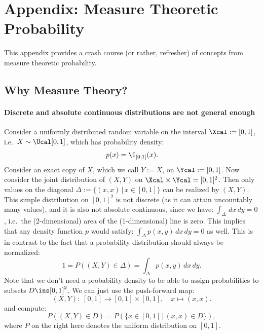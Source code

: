\section{Appendix: Measure Theoretic Probability}%
\label{app:measure-theory}

This appendix provides a crash course (or rather, refresher) of concepts from measure theoretic probability.

\subsection{Why Measure Theory?}%

%
\paragraph*{Discrete and absolute continuous distributions are not general enough}%

\begin{Eg}%
    Consider a uniformly distributed random variable on the interval $\Xcal:=[0,1]$, i.e.\ $X \sim \Ucal[0,1]$, which has probability density:
    \[ p(x) = \I_{[0,1]}(x).\]
    Consider an exact copy of $X$, which we call $Y:=X$, on $\Ycal :=[0,1]$. Now consider the joint distribution of $(X,Y)$ 
    on $\Xcal \times \Ycal = [0,1]^2$.
    Then only values on the diagonal $\Delta:=\{ (x,x) \,|\, x \in [0,1]\}$ can be realized by $(X,Y)$.
    This simple distribution on $[0,1]^2$ is not discrete (as it can attain uncountably many values), and it is also not 
    absolute continuous, since we have: $\int_\Delta \,dx\,dy = 0$, i.e.\ the (2-dimensional) area of the (1-dimensional) line is zero. 
    This implies that any density function $p$ would satisfy: $\int_\Delta p(x,y)\,dx\,dy =0$ as well. This is in contrast to the fact that a probability distribution should always be normalized:
    \[ 1 = P((X,Y) \in \Delta) = \int_\Delta p(x,y)\,dx\,dy.\]
    Note that we don't need a probability density to be able to assign probabilities to subsets $D \ins [0,1]^2$.
    We can just use  the push-forward map:
    \[(X,Y):\; [0,1] \to [0,1] \times [0,1], \quad x \mapsto (x,x).\]
    and compute:
    \[P((X,Y) \in D) = P(\{x \in [0,1]\,|\, (x,x) \in D\}),\]
    where $P$ on the right here denotes the uniform distribution on $[0,1]$.
\end{Eg}%

